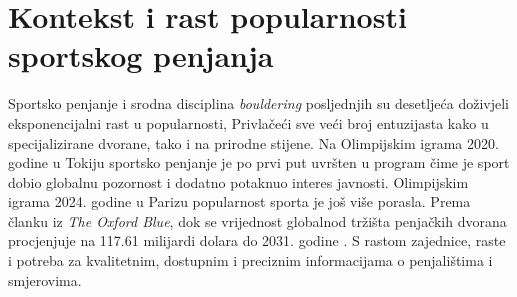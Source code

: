 \section{Kontekst i rast popularnosti sportskog penjanja} 

Sportsko penjanje i srodna disciplina \textit{bouldering} posljednjih su desetljeća doživjeli eksponencijalni rast u popularnosti, Privlačeći sve veći broj entuzijasta kako u specijalizirane dvorane, tako i na prirodne stijene. Na Olimpijskim igrama 2020. godine u Tokiju sportsko penjanje je po prvi put uvršten u program čime je sport dobio globalnu pozornost i dodatno potaknuo interes javnosti. Olimpijskim igrama 2024. godine u Parizu popularnost sporta je još više porasla. Prema članku iz \textit{The Oxford Blue}, dok se vrijednost globalnod tržišta penjačkih dvorana procjenjuje na 117.61 milijardi dolara do 2031. godine \cite{the_oxford_blue_rock_climb}. S rastom zajednice, raste i potreba za kvalitetnim, dostupnim i preciznim informacijama o penjalištima i smjerovima. 